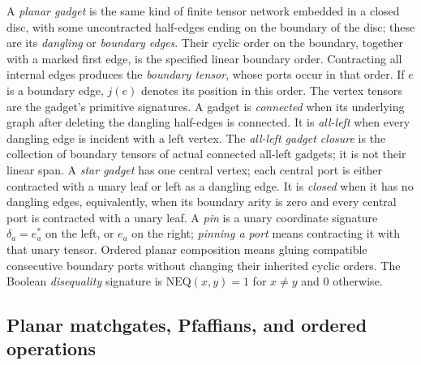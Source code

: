 \documentclass[11pt]{article}
\theoremstyle{definition}
\theoremstyle{remark}
\begin{document}
A \emph{planar gadget} is the same kind of finite tensor network embedded in
a closed disc, with some uncontracted half-edges ending on the boundary of
the disc; these are its \emph{dangling} or \emph{boundary edges}.  Their
cyclic order on the boundary, together with a marked first edge, is the
specified linear boundary order.  Contracting all internal edges produces
the \emph{boundary tensor}, whose ports occur in that order.  If $e$ is a
boundary edge, $j(e)$ denotes its position in this order.  The vertex tensors
are the gadget's primitive signatures.  A
gadget is \emph{connected} when its underlying graph after deleting the
dangling half-edges is connected.  It is \emph{all-left} when every
dangling edge is incident with a left vertex.  The \emph{all-left gadget
closure} is the collection of boundary tensors of actual connected
all-left gadgets; it is not their linear span.  A \emph{star gadget} has
one central vertex; each central port is either contracted with a unary
leaf or left as a dangling edge.  It is \emph{closed} when it has no
dangling edges, equivalently, when its boundary arity is zero and every
central port is contracted with a unary leaf.  A \emph{pin} is a unary
coordinate signature $\delta_a=e_a^*$ on the left, or $e_a$ on the right;
\emph{pinning a port} means contracting it with that unary tensor.  Ordered
planar composition means gluing compatible consecutive boundary ports
without changing their inherited cyclic orders.  The Boolean
\emph{disequality} signature is $\mathrm{NEQ}(x,y)=1$ for $x\ne y$ and $0$
otherwise.

\subsection{Planar matchgates, Pfaffians, and ordered operations}
\label{sec:matchgate-preliminaries}
\end{document}
